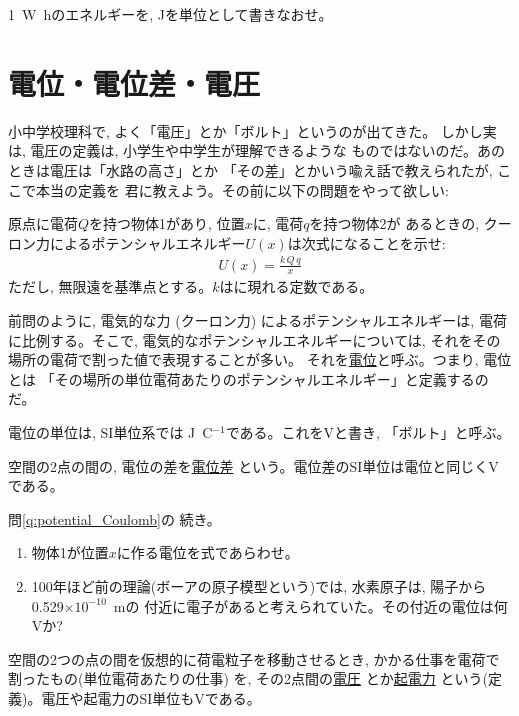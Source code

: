 \begin{q}\label{q:watt_hour}
1~W~hのエネルギーを, Jを単位として書きなおせ。
\end{q}
\hv



\section{電位・電位差・電圧}

小中学校理科で, よく「電圧」とか「ボルト」というのが出てきた。
しかし実は, 電圧の定義は, 小学生や中学生が理解できるような
ものではないのだ。あのときは電圧は「水路の高さ」とか
「その差」とかいう喩え話で教えられたが, ここで本当の定義を
君に教えよう。その前に以下の問題をやって欲しい:

\begin{q}\label{q:potential_Coulomb}
原点に電荷$Q$を持つ物体1があり, 位置$x$に, 電荷$q$を持つ物体2が
あるときの, クーロン力によるポテンシャルエネルギー$U(x)$は次式になることを示せ:
\begin{eqnarray}
U(x)=\frac{k\,Q\,q}{x}\label{eq:potential_Coulomb}
\end{eqnarray}
ただし, 無限遠を基準点とする。$k$はに現れる定数である。
\end{q}
\mv

前問のように, 電気的な力 (クーロン力) によるポテンシャルエネルギーは, 
電荷に比例する。そこで, 電気的なポテンシャルエネルギーについては, 
それをその場所の電荷で割った値で表現することが多い。
それを\underline{電位}と呼ぶ。つまり, 電位とは
「その場所の単位電荷あたりのポテンシャルエネルギー」と定義するのだ。

電位の単位は, SI単位系では J~C$^{-1}$である。これをVと書き, 「ボルト」と呼ぶ。

空間の2点の間の, 電位の差を\underline{電位差}
という。電位差のSI単位は電位と同じくVである。

\begin{q}\label{q:potential_Coulomb2} 問\ref{q:potential_Coulomb}の
続き。
\begin{enumerate}
\item 物体1が位置$x$に作る電位を式であらわせ。
\item 100年ほど前の理論(ボーアの原子模型という)では, 
水素原子は, 陽子から0.529$\times10^{-10}$~mの
付近に電子があると考えられていた。その付近の電位は何Vか?
\end{enumerate}
\end{q}

空間の2つの点の間を仮想的に荷電粒子を移動させるとき, 
かかる仕事を電荷で割ったもの(単位電荷あたりの仕事)
を, その2点間の\underline{電圧}
とか\underline{起電力}
という(定義)。電圧や起電力のSI単位もVである。

